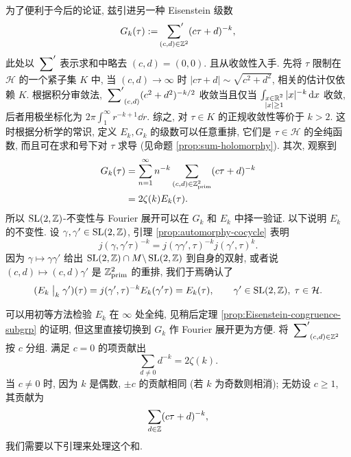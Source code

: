 为了便利于今后的论证, 兹引进另一种 Eisenstein 级数 
\[ G_k(\tau) := \sideset{}{'}\sum_{(c,d) \in \mathbb{Z}^2} (c\tau+d)^{-k}, \]
此处以 $\sideset{}{'}\sum$ 表示求和中略去 $(c,d) = (0,0)$. 且从收敛性入手. 先将 $\tau$ 限制在 $\mathcal{H}$ 的一个紧子集 $K$ 中, 当 $(c,d) \to \infty$ 时 $|c\tau + d| \sim \sqrt{c^2 + d^2}$, 相关的估计仅依赖 $K$. 根据积分审敛法, $\sideset{}{'}\sum_{(c,d)} (c^2 + d^2)^{-k/2}$ 收敛当且仅当 $\int_{\substack{x \in \mathbb{R}^2 \\ |x| \geq 1 }} |x|^{-k} \mathop{}\!\mathrm{d} x$ 收敛, 后者用极坐标化为 $2\pi \int_1^\infty r^{-k+1} \dd r$. 综之, 对 $\tau \in K$ 的正规收敛性等价于 $k > 2$. 这时根据分析学的常识, 定义 $E_k, G_k$ 的级数可以任意重排, 它们是 $\tau \in \mathcal{H}$ 的全纯函数, 而且可在求和号下对 $\tau$ 求导 (见命题 \ref{prop:sum-holomorphy}). 其次, 观察到
\begin{align*}
	G_k(\tau) & = \sum_{n=1}^\infty n^{-k} \sum_{(c,d) \in \mathbb{Z}^2_{\mathrm{prim}}} (c\tau+d)^{-k} \\
	& = 2\zeta(k) E_k(\tau).
\end{align*}
所以 $\operatorname{SL}(2,\mathbb{Z})$-不变性与 Fourier 展开可以在 $G_k$ 和 $E_k$ 中择一验证. 以下说明 $E_k$ 的不变性. 设 $\gamma, \gamma' \in \operatorname{SL}(2,\mathbb{Z})$, 引理 \ref{prop:automorphy-cocycle} 表明
\[ j(\gamma, \gamma'\tau)^{-k} = j(\gamma\gamma', \tau)^{-k} j(\gamma', \tau)^k. \]
因为 $\gamma \mapsto \gamma\gamma'$ 给出 $\operatorname{SL}(2,\mathbb{Z}) \cap M \backslash \operatorname{SL}(2,\mathbb{Z})$ 到自身的双射, 或者说 $(c,d) \mapsto (c,d)\gamma'$ 是 $\mathbb{Z}^2_{\mathrm{prim}}$ 的重排, 我们于焉确认了
\[ (E_k \;\big|_{k} \; \gamma')(\tau) = j(\gamma',\tau)^{-k} E_k(\gamma'\tau) = E_k(\tau), \qquad \gamma' \in \operatorname{SL}(2,\mathbb{Z}), \; \tau \in \mathcal{H}. \]

可以用初等方法检验 $E_k$ 在 $\infty$ 处全纯, 见稍后定理 \ref{prop:Eisenstein-congruence-subgrp} 的证明, 但这里直接切换到 $G_k$ 作 Fourier 展开更为方便. 将 $\sideset{}{'}\sum_{(c,d) \in \mathbb{Z}^2}$ 按 $c$ 分组. 满足 $c = 0$ 的项贡献出
\[ \sum_{d \neq 0} d^{-k} = 2\zeta(k). \]
当 $c \neq 0$ 时, 因为 $k$ 是偶数, $\pm c$ 的贡献相同 (若 $k$ 为奇数则相消); 无妨设 $c \geq 1$, 其贡献为
\[ \sum_{d \in \mathbb{Z}} (c\tau+d)^{-k}, \]
我们需要以下引理来处理这个和.

